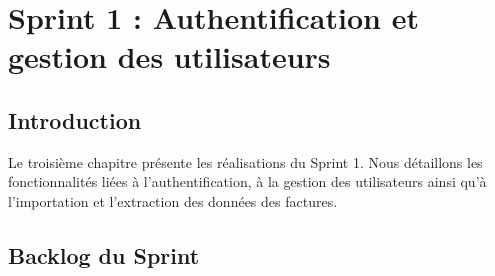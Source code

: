 \chapter{Sprint 1 : Authentification et gestion des utilisateurs}


\newpage

\section{Introduction}

Le troisième chapitre présente les réalisations du Sprint 1. Nous détaillons les fonctionnalités liées à l’authentification, à la gestion des utilisateurs ainsi qu’à l’importation et l’extraction des données des factures.

\section{Backlog du Sprint}

\renewcommand{\arraystretch}{1.5}

